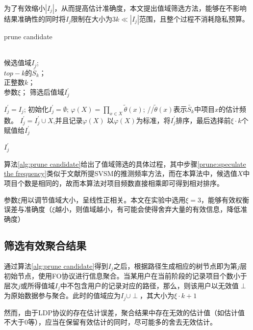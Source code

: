\documentclass[UTF8]{ctexart}
\begin{document}
  为了有效缩小$|I_j|$，从而提高估计准确度，本文提出值域筛选方法，能够在不影响结果准确性的同时将$I_j$限制在大小为$3k \ll |I_j|$范围，且整个过程不消耗隐私预算。

\begin{algorithm}[h]
\caption{prune candidate}
\label{alg:prune candidate}
\begin{algorithmic}[1]
\REQUIRE ~~\\
候选值域$I_{j}$;\\
$top-k$的$\tilde{S_k}$；\\
正整数$k$；\\
参数$\xi$；
\ENSURE 筛选后值域$I^{\prime}_{j}$

    \STATE $I^{\prime}_{j} = I_{j}$;
\ELSE
    \STATE 初始化$I^{\prime}_{j} = \emptyset$;
        \STATE $\varphi(X)=\prod_{x \in X} \tilde{\theta}(x)$;    //$\tilde{\theta}(x)$表示$\tilde{S_k}$中项目$x$的估计频数。\label{prune:speculate the frequency}
        \STATE $I^{\prime}_{j} = I^{\prime}_{j} \cup X$,并且记录$\varphi(X)$
    \ENDFOR
    \STATE 以$\varphi(X)$为标准，将$I^{\prime}_{j}$排序，最后选择前$\xi \cdot k$个赋值给$I^{\prime}_{j}$
\ENDIF

\RETURN $I^{\prime}_{j}$
\end{algorithmic}
\end{algorithm}

  算法\ref{alg:prune candidate}给出了值域筛选的具体过程，其中步骤\ref{prune:speculate the frequency}类似于文献\cite{wang2018locally}所提SVSM的推测频率方法，而在本算法中，候选值$X$中项目个数是相同的，故而本算法对项目频数直接相乘即可得到相对排序。

  参数$\xi$用以调节值域大小，呈线性正相关。本文在实验中选用$\xi = 3$，能够有效权衡误差与准确度（$\xi$越小，则值域越小，有可能会使得舍弃大量的有效信息，降低准确度）

\subsection{筛选有效聚合结果}
  通过算法\ref{alg:prune candidate}得到$I_j$之后，根据路径生成相应的树节点即为第$j$层初始节点，使用FO协议进行信息聚合。当某用户在当前阶段的记录项目个数小于层次$j$或所得值域$I_j$中不包含用户的记录对应的路径，那么，则该用户以无效值$\perp$为原始数据参与聚合。此时的值域应为$I_j \cup \perp$，其大小为$\xi \cdot k + 1$

  然而，由于LDP协议的存在估计误差，聚合结果中存在无效的估计值（如估计值不大于0等），应当在保留有效估计的同时，尽可能多的舍去无效估计。
\end{document}
